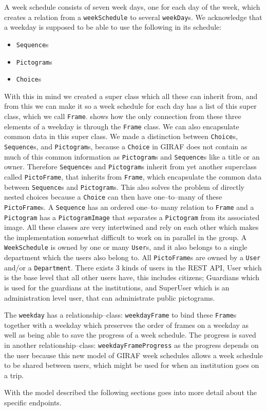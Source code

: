 A week schedule consists of seven week days, one for each day of the week, which creates a relation from a \texttt{weekSchedule} to several \texttt{weekDay}s.
We acknowledge that a weekday is supposed to be able to use the following in its schedule: 

\begin{itemize}
	\item \texttt{Sequence}s
	\item \texttt{Pictogram}s
	\item \texttt{Choice}s
\end{itemize}

With this in mind we created a super class which all these can inherit from, and from this we can make it so a week schedule for each day has a list of this super class, which we call \texttt{Frame}.
 shows how the only connection from these three elements of a weekday is through the \texttt{Frame} class.
We can also encapsulate common data in this super class.
We made a distinction between \texttt{Choice}s, \texttt{Sequence}s, and \texttt{Pictogram}s, because a \texttt{Choice} in GIRAF does not contain as much of this common information as \texttt{Pictogram}s and \texttt{Sequence}s like a title or an owner.
Therefore \texttt{Sequence}s and \texttt{Pictogram}s inherit from yet another superclass called \texttt{PictoFrame}, that inherits from \texttt{Frame}, which encapsulate the common data between \texttt{Sequence}s and \texttt{Pictogram}s.
This also solves the problem of directly nested choices because a \texttt{Choice} can then have one--to--many of these \texttt{PictoFrame}s.
A \texttt{Sequence} has an ordered one--to--many relation to \texttt{Frame} and a \texttt{Pictogram} has a \texttt{PictogramImage} that separates a \texttt{Pictogram} from its associated image.
All these classes are very intertwined and rely on each other which makes the implementation somewhat difficult to work on in parallel in the group.
A \texttt{WeekSchedule} is owned by one or many \texttt{User}s, and it also belongs to a single department which the users also belong to.
All \texttt{PictoFrame}s are owned by a \texttt{User} and/or a \texttt{Department}.
There exists 3 kinds of users in the REST API, User which is the base level that all other users have, this includes citizens; Guardians which is used for the guardians at the institutions, and SuperUser which is an administration level user, that can administrate public pictograms.

The \texttt{weekday} has a relationship--class: \texttt{weekdayFrame} to bind these \texttt{Frame}s together with a weekday which preserves the order of frames on a weekday as well as being able to save the progress of a week schedule.
The progress is saved in another relationship--class: \texttt{weekdayFrameProgress} as the progress depends on the user because this new model of GIRAF week schedules allows a week schedule to be shared between users, which might be used for when an institution goes on a trip.

With the model described the following sections goes into more detail about the specific endpoints.
